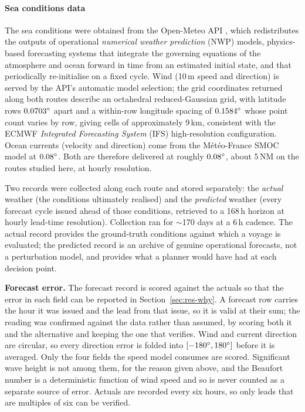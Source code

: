 \documentclass[review,authoryear]{elsarticle}
\begin{document}
\paragraph{Sea conditions data}
The sea conditions were obtained from the Open-Meteo API \citep{openmeteo}, which redistributes the
outputs of operational \emph{numerical weather prediction} (NWP) models, physics-based forecasting
systems that integrate the governing equations of the atmosphere and ocean forward in time from an
estimated initial state, and that periodically re-initialise on a fixed cycle. Wind (10\,m speed and
direction) is served by the API's automatic model selection; the grid coordinates returned along both
routes describe an octahedral reduced-Gaussian grid, with latitude rows $0.0703\degree$ apart and a
within-row longitude spacing of $0.1584\degree$ whose point count varies by row, giving cells of
approximately 9\,km, consistent with the ECMWF \emph{Integrated Forecasting System} (IFS)
high-resolution configuration. Ocean currents (velocity and direction) come from the M\'et\'eo-France
SMOC model at $0.08\degree$. Both are therefore delivered at roughly $0.08\degree$, about 5\,NM on the
routes studied here, at hourly resolution.

Two records were collected along each route and stored separately: the \emph{actual} weather (the
conditions ultimately realised) and the \emph{predicted} weather (every forecast cycle issued
ahead of those conditions, retrieved to a 168\,h horizon at hourly lead-time resolution). Collection
ran for $\sim$170 days at a 6\,h cadence. The actual record provides the ground-truth conditions
against which a voyage is evaluated; the predicted record is an archive of genuine operational
forecasts, not a perturbation model, and provides what a planner would have had at each decision
point.

\noindent\textbf{Forecast error.} The forecast record is scored against the actuals so that the
error in each field can be reported in Section~\ref{sec:res-why}. A forecast row carries the hour it
was issued and the lead from that issue, so it is valid at their sum; the reading was confirmed
against the data rather than assumed, by scoring both it and the alternative and keeping the one that
verifies. Wind and current direction are circular, so every direction error is folded into
$[-180\degree,180\degree]$ before it is averaged. Only the four fields the speed model consumes are
scored. Significant wave height is not among them, for the reason given above, and the Beaufort
number is a deterministic function of wind speed and so is never counted as a separate source of
error. Actuals are recorded every six hours, so only leads that are multiples of six can be verified.
\end{document}
